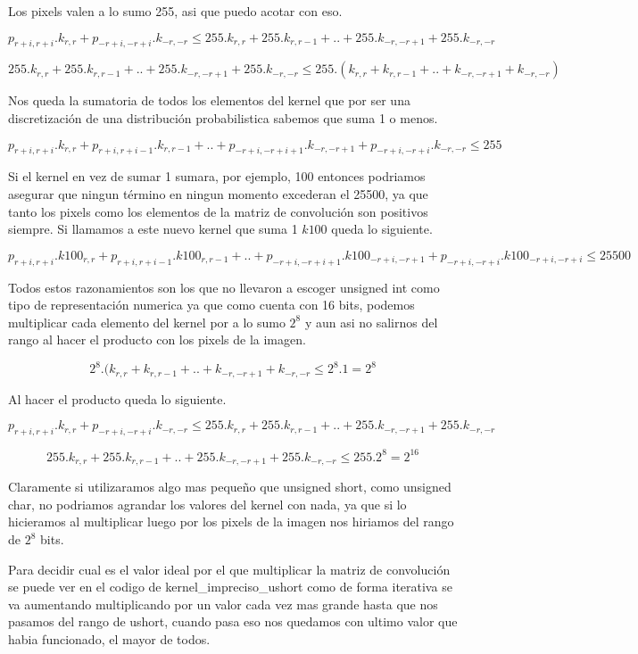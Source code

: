 Los pixels valen a lo sumo 255, asi que puedo acotar con eso.

$$ p_{r+i,r+i}.k_{r,r} + p_{-r+i,-r+i}.k_{-r,-r} \leq 255.k_{r,r} + 255.k_{r,r-1} + .. + 255.k_{-r,-r+1} + 255.k_{-r,-r} $$

$$ 255.k_{r,r} + 255.k_{r,r-1} + .. + 255.k_{-r,-r+1} + 255.k_{-r,-r} \leq 255.(k_{r,r} + k_{r,r-1} + .. + k_{-r,-r+1} + k_{-r,-r}) $$

Nos queda la sumatoria de todos los elementos del kernel que por ser una discretización de una distribución probabilistica sabemos que suma 1 o menos.

$$ p_{r+i,r+i}.k_{r,r} + p_{r+i,r+i-1}.k_{r,r-1} + .. +  p_{-r+i,-r+i+1}.k_{-r,-r+1} + p_{-r+i,-r+i}.k_{-r,-r} \leq 255 $$

Si el kernel en vez de sumar 1 sumara, por ejemplo, 100 entonces podriamos asegurar que ningun término en ningun momento excederan el 25500, ya que tanto los pixels como los elementos de la matriz de convolución son positivos siempre. Si llamamos a este nuevo kernel que suma 1 $k100$ queda lo siguiente.

$$ p_{r+i,r+i}.k100_{r,r} + p_{r+i,r+i-1}.k100_{r,r-1} + .. +  p_{-r+i,-r+i+1}.k100_{-r+i,-r+1} + p_{-r+i,-r+i}.k100_{-r+i,-r+i} \leq 25500 $$

Todos estos razonamientos son los que no llevaron a escoger unsigned int como tipo de representación numerica ya que como cuenta con 16 bits, podemos multiplicar cada elemento del kernel por a lo sumo $2^8$ y aun asi no salirnos del rango al hacer el producto con los pixels de la imagen.

$$ 2^{8}.(k_{r,r} + k_{r,r-1} + .. + k_{-r,-r+1} + k_{-r,-r} \leq 2^{8}.1 = 2^{8} $$

Al hacer el producto queda lo siguiente.

$$ p_{r+i,r+i}.k_{r,r} + p_{-r+i,-r+i}.k_{-r,-r} \leq 255.k_{r,r} + 255.k_{r,r-1} + .. + 255.k_{-r,-r+1} + 255.k_{-r,-r} $$

$$ 255.k_{r,r} + 255.k_{r,r-1} + .. + 255.k_{-r,-r+1} + 255.k_{-r,-r} \leq 255.2^{8} = 2^{16} $$

Claramente si utilizaramos algo mas pequeño que unsigned short, como unsigned char, no podriamos agrandar los valores del kernel con nada, ya que si lo hicieramos al multiplicar luego por los pixels de la imagen nos hiriamos del rango de $2^{8}$ bits.

Para decidir cual es el valor ideal por el que multiplicar la matriz de convolución se puede ver en el codigo de kernel\_impreciso\_ushort como de forma iterativa se va aumentando multiplicando por un valor cada vez mas grande hasta que nos pasamos del rango de ushort, cuando pasa eso nos quedamos con ultimo valor que habia funcionado, el mayor de todos.
 
